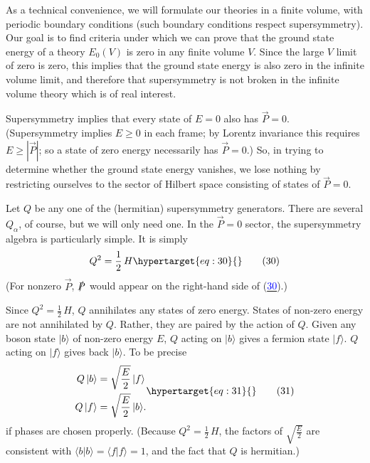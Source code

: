 \documentclass[11pt,a4paper]{article}
\newcommand{\eqtarget}[1]{\hypertarget{eq:#1}{\mathstrut}\tag{#1}}
\newcommand{\eqnref}[1]{(\hyperlink{eq:#1}{\textcolor{blue}{#1}})}
\begin{document}
As a technical convenience, we will formulate our theories in a
finite volume, with periodic boundary conditions (such boundary conditions
respect supersymmetry). Our goal is to find criteria under
which we can prove that the ground state energy of a theory $E_0(V)$ is
zero in any finite volume $V$. Since the large $V$ limit of zero is zero,
this implies that the ground state energy is also zero in the infinite
volume limit, and therefore that supersymmetry is not broken in the
infinite volume theory which is of real interest.

Supersymmetry implies that every state of $E = 0$ also has $\vec P = 0$.
(Supersymmetry implies $E \geq 0$ in each frame; by Lorentz invariance
this requires $E \geq |\vec P|$; so a state of zero energy necessarily has
$\vec P = 0$.) So, in trying to determine whether the ground state energy
vanishes, we lose nothing by restricting ourselves to the sector of
Hilbert space consisting of states of $\vec P = 0$.

Let $Q$ be any one of the (hermitian) supersymmetry generators.
There are several $Q_\alpha$, of course, but we will only need one. In the
$\vec P = 0$ sector, the supersymmetry algebra is particularly simple. It
is simply
\begin{equation}
Q^2 = \frac{1}{2}\, H
\eqtarget{30}
\end{equation}
(For nonzero $\vec P$, $\slashed{P}$ would appear on the right-hand side of \eqnref{30}.)

Since $Q^2 = \frac{1}{2}\, H$, $Q$ annihilates any states of zero energy. States
of non-zero energy are not annihilated by $Q$. Rather, they are paired
by the action of $Q$. Given any boson state $|b\rangle$ of non-zero energy $E$,
$Q$ acting on $|b\rangle$ gives a fermion state $|f\rangle$. $Q$ acting on $|f\rangle$ gives
back $|b\rangle$. To be precise
\begin{equation}
\begin{aligned}
Q\, |b\rangle &= \sqrt{\frac{E}{2}}\, |f\rangle \\
Q\, |f\rangle &= \sqrt{\frac{E}{2}}\, |b\rangle .
\end{aligned}
\eqtarget{31}
\end{equation}
if phases are chosen properly. (Because $Q^2 = \frac{1}{2}\, H$, the factors of
$\sqrt{\frac{E}{2}}$ are consistent with $\langle b|b\rangle = \langle f|f\rangle = 1$, and the fact that $Q$ is
hermitian.)
\end{document}
